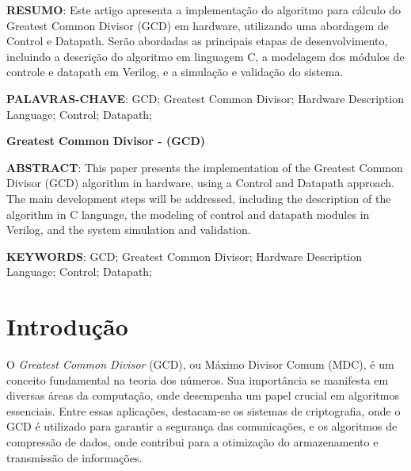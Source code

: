 \documentclass[a4paper,11pt]{article} %
\begin{document}


\begin{center}
    \tableofcontents %
\end{center}

\newpage


\vspace{0.5cm}
\noindent\textbf{RESUMO}: 
Este artigo apresenta a implementação do algoritmo para cálculo do 
Greatest Common Divisor (GCD) em hardware, 
utilizando uma abordagem de Control e Datapath. 
Serão abordadas as principais etapas de desenvolvimento, 
incluindo a descrição do algoritmo em linguagem C, 
a modelagem dos módulos de controle e datapath em Verilog, 
e a simulação e validação do sistema.

\vspace{0.5cm}
\noindent\textbf{PALAVRAS-CHAVE}: 
GCD; Greatest Common Divisor; Hardware Description Language; Control; Datapath;

\vspace{0.5cm}
 \begin{center}
 \textbf{Greatest Common Divisor - (GCD)}
 \end{center}

\noindent\textbf{ABSTRACT}: 
This paper presents the implementation of the Greatest Common Divisor (GCD) 
algorithm in hardware, using a Control and Datapath approach. 
The main development steps will be addressed, 
including the description of the algorithm in C language, 
the modeling of control and datapath modules in Verilog, 
and the system simulation and validation.

\vspace{0.5cm}
\noindent\textbf{KEYWORDS}: 
GCD; Greatest Common Divisor; Hardware Description Language; Control; Datapath;

\section{Introdução}

O \textit{Greatest Common Divisor} (GCD), ou Máximo Divisor Comum (MDC), é um conceito fundamental na teoria dos números. Sua importância se manifesta em diversas áreas da computação, onde desempenha um papel crucial em algoritmos essenciais. Entre essas aplicações, destacam-se os sistemas de criptografia, onde o GCD é utilizado para garantir a segurança das comunicações, e os algoritmos de compressão de dados, onde contribui para a otimização do armazenamento e transmissão de informações.
\end{document}
